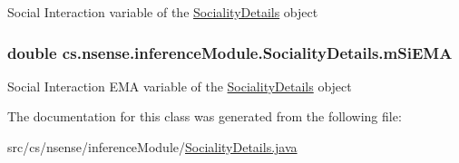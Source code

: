 Social Interaction variable of the \hyperlink{classcs_1_1nsense_1_1inference_module_1_1_sociality_details}{Sociality\-Details} object \hypertarget{classcs_1_1nsense_1_1inference_module_1_1_sociality_details_a2174115bf6d09faef8cbbaca72bdd870}{
\subsubsection[{m\-Si\-E\-M\-A}]{\setlength{\rightskip}{0pt plus 5cm}double cs.\-nsense.\-inference\-Module.\-Sociality\-Details.\-m\-Si\-E\-M\-A}}\label{classcs_1_1nsense_1_1inference_module_1_1_sociality_details_a2174115bf6d09faef8cbbaca72bdd870}
Social Interaction E\-M\-A variable of the \hyperlink{classcs_1_1nsense_1_1inference_module_1_1_sociality_details}{Sociality\-Details} object 

The documentation for this class was generated from the following file\-:\begin{DoxyCompactItemize}
\item 
src/cs/nsense/inference\-Module/\hyperlink{_sociality_details_8java}{Sociality\-Details.\-java}\end{DoxyCompactItemize}

